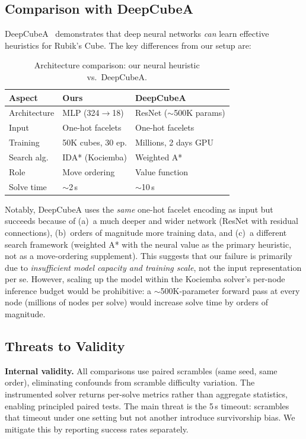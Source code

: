 \documentclass[10pt,twocolumn,a4paper]{article}
\begin{document}
\subsection{Comparison with DeepCubeA}

DeepCubeA~\cite{deepcubea} demonstrates that deep neural networks \emph{can} learn effective heuristics for Rubik's Cube. The key differences from our setup are:

\begin{table}[t]
\centering
\caption{Architecture comparison: our neural heuristic vs.\ DeepCubeA.}
\label{tab:vs-deepcubea}
\begin{tabular}{@{}lll@{}}
\toprule
\textbf{Aspect} & \textbf{Ours} & \textbf{DeepCubeA} \\
\midrule
Architecture  & MLP (324$\to$18) & ResNet ($\sim$500K params) \\
Input         & One-hot facelets  & One-hot facelets \\
Training      & 50K cubes, 30 ep. & Millions, 2 days GPU \\
Search alg.   & IDA* (Kociemba)  & Weighted A* \\
Role          & Move ordering    & Value function \\
Solve time    & $\sim$2\,s       & $\sim$10\,s \\
\bottomrule
\end{tabular}
\end{table}

Notably, DeepCubeA uses the \emph{same} one-hot facelet encoding as input but succeeds because of (a)~a much deeper and wider network (ResNet with residual connections), (b)~orders of magnitude more training data, and (c)~a different search framework (weighted A* with the neural value as the primary heuristic, not as a move-ordering supplement). This suggests that our failure is primarily due to \emph{insufficient model capacity and training scale}, not the input representation per se. However, scaling up the model within the Kociemba solver's per-node inference budget would be prohibitive: a $\sim$500K-parameter forward pass at every node (millions of nodes per solve) would increase solve time by orders of magnitude.

\subsection{Threats to Validity}

\textbf{Internal validity.} All comparisons use paired scrambles (same seed, same order), eliminating confounds from scramble difficulty variation. The instrumented solver returns per-solve metrics rather than aggregate statistics, enabling principled paired tests. The main threat is the 5\,s timeout: scrambles that timeout under one setting but not another introduce survivorship bias. We mitigate this by reporting success rates separately.
\end{document}
